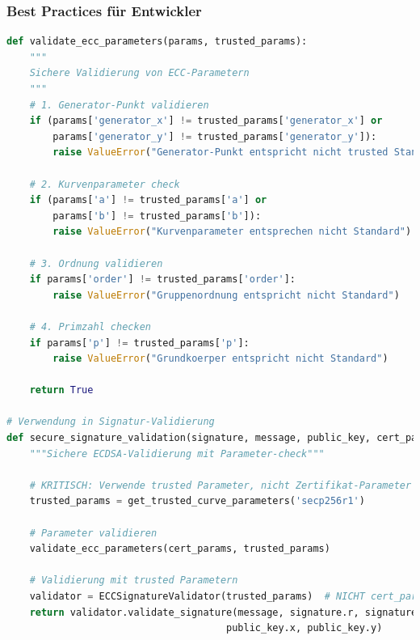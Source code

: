 \documentclass{article}
\begin{document}
\subsubsection{Best Practices für Entwickler}

\begin{lstlisting}[language=python, caption=Sichere Parameter-Validierung]
def validate_ecc_parameters(params, trusted_params):
    """
    Sichere Validierung von ECC-Parametern
    """
    # 1. Generator-Punkt validieren
    if (params['generator_x'] != trusted_params['generator_x'] or 
        params['generator_y'] != trusted_params['generator_y']):
        raise ValueError("Generator-Punkt entspricht nicht trusted Standard")
    
    # 2. Kurvenparameter check  
    if (params['a'] != trusted_params['a'] or 
        params['b'] != trusted_params['b']):
        raise ValueError("Kurvenparameter entsprechen nicht Standard")
    
    # 3. Ordnung validieren
    if params['order'] != trusted_params['order']:
        raise ValueError("Gruppenordnung entspricht nicht Standard")
    
    # 4. Primzahl checken
    if params['p'] != trusted_params['p']:
        raise ValueError("Grundkoerper entspricht nicht Standard")
    
    return True

# Verwendung in Signatur-Validierung
def secure_signature_validation(signature, message, public_key, cert_params):
    """Sichere ECDSA-Validierung mit Parameter-check"""

    # KRITISCH: Verwende trusted Parameter, nicht Zertifikat-Parameter
    trusted_params = get_trusted_curve_parameters('secp256r1')
    
    # Parameter validieren
    validate_ecc_parameters(cert_params, trusted_params)
    
    # Validierung mit trusted Parametern
    validator = ECCSignatureValidator(trusted_params)  # NICHT cert_params!
    return validator.validate_signature(message, signature.r, signature.s, 
                                      public_key.x, public_key.y)
\end{lstlisting}
\end{document}

